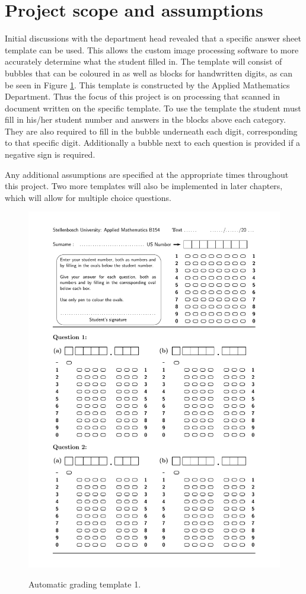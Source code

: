 \section{Project scope and assumptions}\label{sec:Scope}
Initial discussions with the department head revealed that a specific answer sheet template can be used. This allows the custom image processing software to more accurately determine what the student filled in. The template will consist of bubbles that can be coloured in as well as blocks for handwritten digits, as can be seen in Figure \ref{fig:NumbersTemplate}. This template is constructed by the Applied Mathematics Department. Thus the focus of this project is on processing that scanned in document written on the specific template. To use the template the student must fill in his/her student number and answers in the blocks above each category. They are also required to fill in the bubble underneath each digit, corresponding to that specific digit. Additionally a bubble next to each question is provided if a negative sign is required.

Any additional assumptions are specified at the appropriate times throughout this project. Two more templates will also be implemented in later chapters, which will allow for multiple choice questions.

\begin{figure}
  \centering
  \includegraphics[width=14cm]{NumbersTemplate}\\
  \caption{Automatic grading template 1.}
  \label{fig:NumbersTemplate}
\end{figure}

